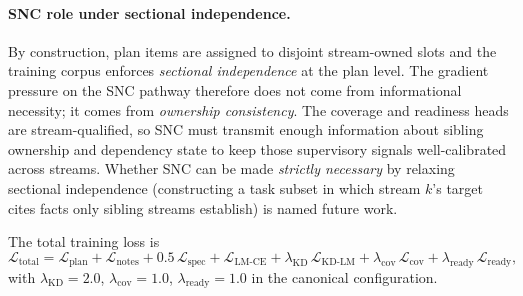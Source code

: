 \paragraph{SNC role under sectional independence.} By construction, plan items are assigned to disjoint stream-owned slots and the training corpus enforces \emph{sectional independence} at the plan level. The gradient pressure on the SNC pathway therefore does not come from informational necessity; it comes from \emph{ownership consistency}. The coverage and readiness heads are stream-qualified, so SNC must transmit enough information about sibling ownership and dependency state to keep those supervisory signals well-calibrated across streams. Whether SNC can be made \emph{strictly necessary} by relaxing sectional independence (constructing a task subset in which stream $k$'s target cites facts only sibling streams establish) is named future work.

The total training loss is
\[
\mathcal{L}_{\text{total}} = \mathcal{L}_{\text{plan}} + \mathcal{L}_{\text{notes}} + 0.5\,\mathcal{L}_{\text{spec}} + \mathcal{L}_{\text{LM-CE}} + \lambda_{\text{KD}}\,\mathcal{L}_{\text{KD-LM}} + \lambda_{\text{cov}}\,\mathcal{L}_{\text{cov}} + \lambda_{\text{ready}}\,\mathcal{L}_{\text{ready}},
\]
with $\lambda_{\text{KD}} = 2.0$, $\lambda_{\text{cov}} = 1.0$, $\lambda_{\text{ready}} = 1.0$ in the canonical configuration.

